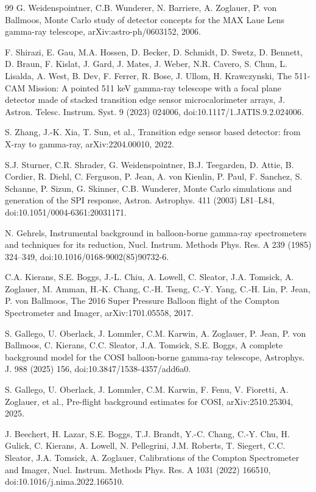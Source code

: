 \documentclass[11pt]{article}
\begin{document}
\begin{thebibliography}{99}
G. Weidenspointner, C.B. Wunderer, N. Barriere, A. Zoglauer, P. von Ballmoos, Monte Carlo study of detector concepts for the MAX Laue Lens gamma-ray telescope, arXiv:astro-ph/0603152, 2006.

F. Shirazi, E. Gau, M.A. Hossen, D. Becker, D. Schmidt, D. Swetz, D. Bennett, D. Braun, F. Kislat, J. Gard, J. Mates, J. Weber, N.R. Cavero, S. Chun, L. Lisalda, A. West, B. Dev, F. Ferrer, R. Bose, J. Ullom, H. Krawczynski, The 511-CAM Mission: A pointed 511 keV gamma-ray telescope with a focal plane detector made of stacked transition edge sensor microcalorimeter arrays, J. Astron. Telesc. Instrum. Syst. 9 (2023) 024006, doi:10.1117/1.JATIS.9.2.024006.

S. Zhang, J.-K. Xia, T. Sun, et al., Transition edge sensor based detector: from X-ray to gamma-ray, arXiv:2204.00010, 2022.

S.J. Sturner, C.R. Shrader, G. Weidenspointner, B.J. Teegarden, D. Attie, B. Cordier, R. Diehl, C. Ferguson, P. Jean, A. von Kienlin, P. Paul, F. Sanchez, S. Schanne, P. Sizun, G. Skinner, C.B. Wunderer, Monte Carlo simulations and generation of the SPI response, Astron. Astrophys. 411 (2003) L81--L84, doi:10.1051/0004-6361:20031171.

N. Gehrels, Instrumental background in balloon-borne gamma-ray spectrometers and techniques for its reduction, Nucl. Instrum. Methods Phys. Res. A 239 (1985) 324--349, doi:10.1016/0168-9002(85)90732-6.

C.A. Kierans, S.E. Boggs, J.-L. Chiu, A. Lowell, C. Sleator, J.A. Tomsick, A. Zoglauer, M. Amman, H.-K. Chang, C.-H. Tseng, C.-Y. Yang, C.-H. Lin, P. Jean, P. von Ballmoos, The 2016 Super Pressure Balloon flight of the Compton Spectrometer and Imager, arXiv:1701.05558, 2017.

S. Gallego, U. Oberlack, J. Lommler, C.M. Karwin, A. Zoglauer, P. Jean, P. von Ballmoos, C. Kierans, C.C. Sleator, J.A. Tomsick, S.E. Boggs, A complete background model for the COSI balloon-borne gamma-ray telescope, Astrophys. J. 988 (2025) 156, doi:10.3847/1538-4357/add6a0.

S. Gallego, U. Oberlack, J. Lommler, C.M. Karwin, F. Fenu, V. Fioretti, A. Zoglauer, et al., Pre-flight background estimates for COSI, arXiv:2510.25304, 2025.

J. Beechert, H. Lazar, S.E. Boggs, T.J. Brandt, Y.-C. Chang, C.-Y. Chu, H. Gulick, C. Kierans, A. Lowell, N. Pellegrini, J.M. Roberts, T. Siegert, C.C. Sleator, J.A. Tomsick, A. Zoglauer, Calibrations of the Compton Spectrometer and Imager, Nucl. Instrum. Methods Phys. Res. A 1031 (2022) 166510, doi:10.1016/j.nima.2022.166510.


\end{thebibliography}
\end{document}
